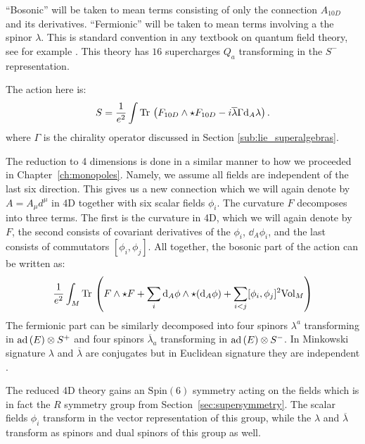 ``Bosonic'' will be taken to mean terms consisting of only the connection $A_{10D}$ and its derivatives. ``Fermionic'' will be taken to mean terms involving a the spinor $\lambda$. This is standard convention in any textbook on quantum field theory, see for example \cite{schwartz2014}. This theory has $16$ supercharges $Q_a$ transforming in the $S^-$ representation.

The action here is:
\begin{equation}
	S = \frac{1}{e^2} \int \mathrm{Tr}\, \left(F_{10D} \wedge \star F_{10D} - i \overline \lambda \Gamma \mathrm{d}_A \lambda \right).
\end{equation}
where $\Gamma$ is the chirality operator discussed in Section \ref{sub:lie_superalgebras}.

The reduction to 4 dimensions is done in a similar manner to how we proceeded in Chapter~\ref{ch:monopoles}. Namely, we assume all fields are independent of the last six direction. This gives us a new connection which we will again denote by $A =A_\mu d^\mu$ in 4D together with six scalar fields $\phi_i$. The curvature $F$ decomposes into three terms. The first is the curvature in 4D, which we will again denote by $F$, the second consists of covariant derivatives of the $\phi_i$, $\dd_A \phi_i$, and the last consists of commutators $[\phi_i, \phi_j]$. All together, the bosonic part of the action can be written as:
\begin{equation}
	\frac{1}{e^2} \int_M \mathrm{Tr}\,\left( F \wedge \star F + \sum_i \mathrm{d}_A \phi \wedge \star (\mathrm{d}_A \phi) +  \sum_{i < j} [\phi_i, \phi_j]^2 \mathrm{Vol}_M \right)
\end{equation}
The fermionic part can be similarly decomposed into four spinors $\lambda^a$ transforming in $\mathrm{ad}\,(E) \otimes S^+$ and four spinors $\overline \lambda_a$ transforming in $\mathrm{ad}\,(E) \otimes S^-$. In Minkowski signature $\lambda$ and $\overline \lambda$ are conjugates but in Euclidean signature they are independent \cite{kapustin2008}.

The reduced 4D theory gains an $\mathrm{Spin}(6)$ symmetry acting on the fields which is in fact the $R$ symmetry group from Section~\ref{sec:supersymmetry}. The scalar fields $\phi_i$ transform in the vector representation of this group, while the $\lambda$ and $\overline \lambda$ transform as spinors and dual spinors of this group as well.

